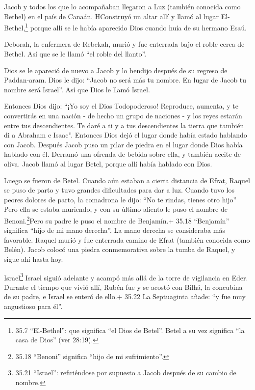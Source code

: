  Jacob y todos los que lo acompañaban llegaron a Luz
(también conocida como Bethel) en el país de Canaán. 
HConstruyó un altar allí y llamó al lugar El-Bethel,\footnote{35.7
  ``El-Bethel'': que significa ``el Dios de Betel''. Betel a su vez
  significa ``la casa de Dios'' (ver 28:19).} porque allí se le había
aparecido Dios cuando huía de su hermano Esaú.

 Deborah, la enfermera de Rebekah, murió y fue enterrada
bajo el roble cerca de Bethel. Así que se le llamó ``el roble del
llanto''.

 Dios se le apareció de nuevo a Jacob y lo bendijo después
de su regreso de Paddan-aram.  Dios le dijo: ``Jacob no
será más tu nombre. En lugar de Jacob tu nombre será Israel''. Así que
Dios le llamó Israel.

 Entonces Dios dijo: ``¡Yo soy el Dios Todopoderoso!
Reproduce, aumenta, y te convertirás en una nación - de hecho un grupo
de naciones - y los reyes estarán entre tus descendientes. 
Te daré a ti y a tus descendientes la tierra que también di a Abraham e
Isaac''.  Entonces Dios dejó el lugar donde había estado
hablando con Jacob.  Después Jacob puso un pilar de piedra
en el lugar donde Dios había hablado con él. Derramó una ofrenda de
bebida sobre ella, y también aceite de oliva.  Jacob llamó
al lugar Betel, porque allí había hablado con Dios.

 Luego se fueron de Betel. Cuando aún estaban a cierta
distancia de Efrat, Raquel se puso de parto y tuvo grandes dificultades
para dar a luz.  Cuando tuvo los peores dolores de parto,
la comadrona le dijo: ``No te rindas, tienes otro hijo'' 
Pero ella se estaba muriendo, y con su último aliento le puso el nombre
de Benoni.\footnote{35.18 ``Benoni'' significa ``hijo de mi
  sufrimiento''.}Pero su padre le puso el nombre de Benjamín.+ 35.18
``Benjamín'' significa ``hijo de mi mano derecha''. La mano derecha se
consideraba más favorable.  Raquel murió y fue enterrada
camino de Efrat (también conocida como Belén).  Jacob
colocó una piedra conmemorativa sobre la tumba de Raquel, y sigue ahí
hasta hoy.

 Israel\footnote{35.21 ``Israel'': refiriéndose por
  supuesto a Jacob después de su cambio de nombre.} Israel siguió
adelante y acampó más allá de la torre de vigilancia en Eder.
 Durante el tiempo que vivió allí, Rubén fue y se acostó
con Bilhá, la concubina de su padre, e Israel se enteró de ello.+ 35.22
La Septuaginta añade: ``y fue muy angustioso para él''.

